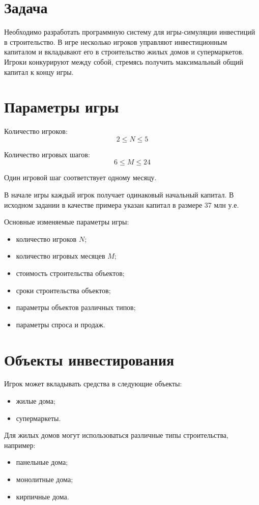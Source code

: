 \documentclass[a4paper,12pt]{article}
\begin{document}
\section{Задача}

Необходимо разработать программную систему для игры-симуляции инвестиций в строительство.
В игре несколько игроков управляют инвестиционным капиталом и вкладывают его в строительство жилых домов и супермаркетов. Игроки конкурируют между собой, стремясь получить максимальный общий капитал к концу игры.

\section{Параметры игры}

Количество игроков:
\[
2 \leq N \leq 5
\]

Количество игровых шагов:
\[
6 \leq M \leq 24
\]

Один игровой шаг соответствует одному месяцу.

В начале игры каждый игрок получает одинаковый начальный капитал. В исходном задании в качестве примера указан капитал в размере 37 млн у.е.

Основные изменяемые параметры игры:
\begin{itemize}
    \item количество игроков $N$;
    \item количество игровых месяцев $M$;
    \item стоимость строительства объектов;
    \item сроки строительства объектов;
    \item параметры объектов различных типов;
    \item параметры спроса и продаж.
\end{itemize}

\section{Объекты инвестирования}

Игрок может вкладывать средства в следующие объекты:
\begin{itemize}
    \item жилые дома;
    \item супермаркеты.
\end{itemize}

Для жилых домов могут использоваться различные типы строительства, например:
\begin{itemize}
    \item панельные дома;
    \item монолитные дома;
    \item кирпичные дома.
\end{itemize}
\end{document}
